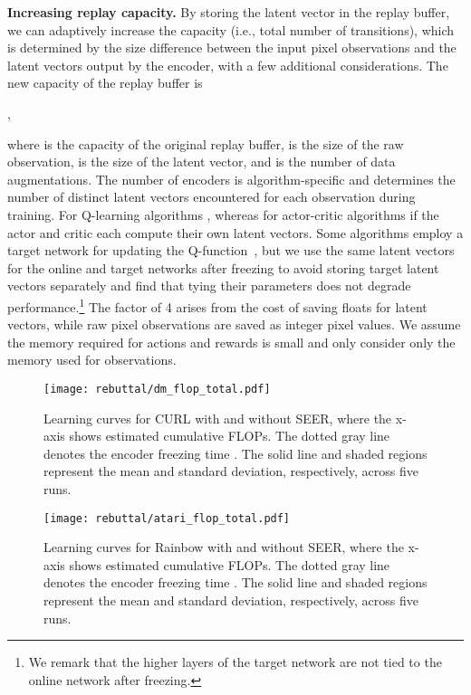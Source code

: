 \documentclass{article}
\begin{document}
\textbf{Increasing replay capacity.} 
By storing the latent vector in the replay buffer,
we can adaptively increase the capacity (i.e., total number of transitions), which is determined by the size difference between the input pixel observations and the latent vectors output by the encoder, with a few additional considerations.
The new capacity of the replay buffer is
\begin{center}
    ,
\end{center}
where  is the capacity of the original replay buffer,  is the size of the raw observation,  is the size of the latent vector, and  is the number of data augmentations. 
The number of encoders  is algorithm-specific and determines the number of distinct latent vectors encountered for each observation during training.
For Q-learning algorithms , whereas for actor-critic algorithms  if the actor and critic each compute their own latent vectors. Some algorithms employ a target network for updating the  Q-function~\citep{mnih2015human,haarnoja2018soft}, 
but we use the same latent vectors for the online and target networks after freezing to avoid storing target latent vectors separately and find that tying their parameters does not degrade performance.\footnote{We remark that the higher layers of the target network are not tied to the online network after freezing.}
The factor of 4 arises from the cost of saving floats for latent vectors, while raw pixel observations are saved as integer pixel values. We assume the memory required for actions and rewards is small and only consider only the memory used for observations. 

\begin{figure*} [t] \centering
\texttt{[image: rebuttal/dm\_flop\_total.pdf]}
\caption{Learning curves for CURL with and without SEER, where the x-axis shows estimated cumulative FLOPs. The dotted gray line denotes the encoder freezing time . 
The solid line and shaded regions represent the mean and standard deviation, respectively, across five runs.}
\label{fig:main_dmc}
\vspace{-0.1in}
\end{figure*}

\begin{figure*} [t] \centering
\texttt{[image: rebuttal/atari\_flop\_total.pdf]}
\caption{Learning curves for Rainbow with and without SEER, where the x-axis shows estimated cumulative FLOPs. The dotted gray line denotes the encoder freezing time . The solid line and shaded regions represent the mean and standard deviation, respectively, across five runs.}
\label{fig:main_atari}
\vspace{-0.1in}
\end{figure*}
\end{document}
